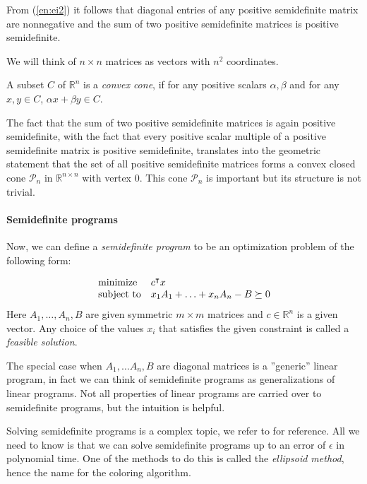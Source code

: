From (\ref{en:ei2}) it follows that diagonal entries of any positive semidefinite matrix are nonnegative and the sum of two positive semidefinite matrices is positive semidefinite.

We will think of $n \times n$ matrices as vectors with $n^2$ coordinates.
\begin{defn}
  A subset $C$ of $\mathbb{R}^n$ is a \emph{convex cone}, if for any positive scalars $\alpha, \beta$ and for any $x, y \in C$, $\alpha x + \beta y \in C$.
\end{defn}

The fact that the sum of two positive semidefinite matrices is again positive semidefinite, with the fact that every positive scalar multiple of a positive semidefinite matrix is positive semidefinite, translates into the geometric statement that the set of all positive semidefinite matrices forms a convex closed cone $\mathcal{P}_n$ in $\mathbb{R}^{n \times n}$ with vertex 0. This cone $\mathcal{P}_n$ is important but its structure is not trivial.

\paragraph{Semidefinite programs}

Now, we can define a \emph{semidefinite program} to be an optimization problem of the following form:

\begin{equation*}
  \begin{array}{ll@{}ll}
    \text{minimize}   & c^\intercal x                          & \\
    \text{subject to} & x_1A_1 + \ldots + x_nA_n - B \succeq 0   \\
  \end{array}
\end{equation*}
Here $A_1, \ldots, A_n, B$ are given symmetric $m \times m$ matrices and $c \in \mathbb{R}^n$ is a given vector. Any choice of the values $x_i$ that satisfies the given constraint is called a \emph{feasible solution}.

The special case when $A_1, \ldots A_n, B$ are diagonal matrices is a ''generic'' linear program, in fact we can think of semidefinite programs as generalizations of linear programs. Not all properties of linear programs are carried over to semidefinite programs, but the intuition is helpful.

Solving semidefinite programs is a complex topic, we refer to \cite{grotschel1993} for reference. All we need to know is that we can solve semidefinite programs up to an error of $\epsilon$ in polynomial time. One of the methods to do this is called the \emph{ellipsoid method}, hence the name for the coloring algorithm.

